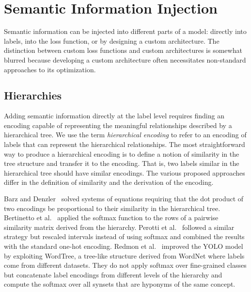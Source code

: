 \section{Semantic Information Injection}
\label{sec:semantic-information-injection}

Semantic information can be injected into different parts of a model: directly into labels, into the loss function, or by designing a custom architecture. The distinction between custom loss functions and custom architectures is somewhat blurred because developing a custom architecture often necessitates non-standard approaches to its optimization.

\subsection{Hierarchies}
\label{subsec:hierarchies}

Adding semantic information directly at the label level requires finding an encoding capable of representing the meaningful relationships described by a hierarchical tree. We use the term \emph{hierarchical encoding} to refer to an encoding of labels that can represent the hierarchical relationships. The most straightforward way to produce a hierarchical encoding is to define a notion of similarity in the tree structure and transfer it to the encoding. That is, two labels similar in the hierarchical tree should have similar encodings. The various proposed approaches differ in the definition of similarity and the derivation of the encoding. 

Barz and Denzler~\cite{HierarchyBasedBarz2018} solved systems of equations requiring that the dot product of two encodings be proportional to their similarity in the hierarchical tree.
Bertinetto et al.~\cite{MakingBetterMBertin2019} applied the softmax function to the rows of a pairwise similarity matrix derived from the hierarchy.
Perotti et al.~\cite{BeyondOneHotPerott2023} followed a similar strategy but rescaled intervals instead of using softmax and combined the results with the standard one-hot encoding.
Redmon et al.~\cite{Yolo9000BetteRedmon2016} improved the YOLO model~\cite{YouOnlyLookORedmon2015} by exploiting WordTree, a tree-like structure derived from WordNet where labels come from different datasets. They do not apply softmax over fine-grained classes but concatenate label encodings from different levels of the hierarchy and compute the softmax over all synsets that are hyponyms of the same concept.

